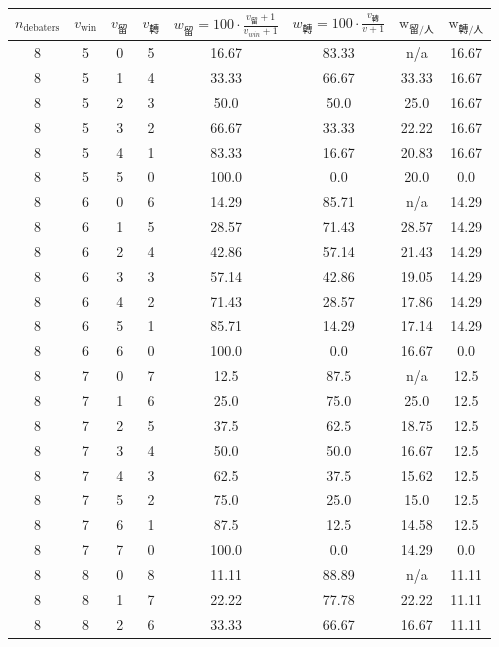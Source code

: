 \begin{table}[H]
    \centering
    \small
    \begin{threeparttable}
    \begin{tabular}{cccccccc}
    \toprule
    $n_{\text{debaters}}$ & $v_{\text{win}}$ & $v_{\text{留}}$ & $v_{\text{轉}}$ & $w_{\text{留}} = 100 \cdot \frac{v_{\text{留}}+1}{v_{win}+1} $ & $w_{\text{轉}} = 100\cdot\frac{v_{\text{轉}}}{v+1}$ & $\text{w}_{\text{留}/\text{人} }$ & $\text{w}_{\text{轉}/\text{人}}$ \\
    \midrule
8 & 5 & 0 & 5 & 16.67 & 83.33 & n/a\tnote{a} & 16.67 \\
8 & 5 & 1 & 4 & 33.33 & 66.67 & 33.33 & 16.67 \\
8 & 5 & 2 & 3 & 50.0 & 50.0 & 25.0 & 16.67 \\
8 & 5 & 3 & 2 & 66.67 & 33.33 & 22.22 & 16.67 \\
8 & 5 & 4 & 1 & 83.33 & 16.67 & 20.83 & 16.67 \\
8 & 5 & 5 & 0 & 100.0 & 0.0 & 20.0 & 0.0 \\
8 & 6 & 0 & 6 & 14.29 & 85.71 & n/a\tnote{a} & 14.29 \\
8 & 6 & 1 & 5 & 28.57 & 71.43 & 28.57 & 14.29 \\
8 & 6 & 2 & 4 & 42.86 & 57.14 & 21.43 & 14.29 \\
8 & 6 & 3 & 3 & 57.14 & 42.86 & 19.05 & 14.29 \\
8 & 6 & 4 & 2 & 71.43 & 28.57 & 17.86 & 14.29 \\
8 & 6 & 5 & 1 & 85.71 & 14.29 & 17.14 & 14.29 \\
8 & 6 & 6 & 0 & 100.0 & 0.0 & 16.67 & 0.0 \\
8 & 7 & 0 & 7 & 12.5 & 87.5 & n/a\tnote{a} & 12.5 \\
8 & 7 & 1 & 6 & 25.0 & 75.0 & 25.0 & 12.5 \\
8 & 7 & 2 & 5 & 37.5 & 62.5 & 18.75 & 12.5 \\
8 & 7 & 3 & 4 & 50.0 & 50.0 & 16.67 & 12.5 \\
8 & 7 & 4 & 3 & 62.5 & 37.5 & 15.62 & 12.5 \\
8 & 7 & 5 & 2 & 75.0 & 25.0 & 15.0 & 12.5 \\
8 & 7 & 6 & 1 & 87.5 & 12.5 & 14.58 & 12.5 \\
8 & 7 & 7 & 0 & 100.0 & 0.0 & 14.29 & 0.0 \\
8 & 8 & 0 & 8 & 11.11 & 88.89 & n/a\tnote{a} & 11.11 \\
8 & 8 & 1 & 7 & 22.22 & 77.78 & 22.22 & 11.11 \\
8 & 8 & 2 & 6 & 33.33 & 66.67 & 16.67 & 11.11 \\

\end{tabular}
\end{threeparttable}
\end{table}

